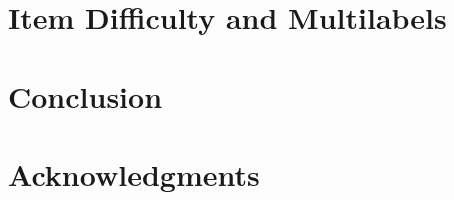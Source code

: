 \documentclass[11pt]{article}
\begin{document}
\section{Item Difficulty and Multilabels}


\section{Conclusion} %

\section*{Acknowledgments}


\end{document}
